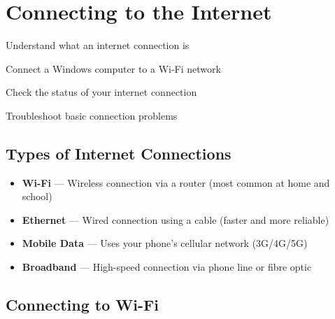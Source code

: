 
\chapter{Connecting to the Internet}
\label{ch:internet-win}

\begin{objectives}
  \item Understand what an internet connection is
  \item Connect a Windows computer to a Wi-Fi network
  \item Check the status of your internet connection
  \item Troubleshoot basic connection problems
\end{objectives}


\section{Types of Internet Connections}
\label{sec:connection-types}

\begin{theorybox}
\begin{itemize}[leftmargin=*, label={\textcolor{ModuleBlue}{\faAngleRight}}, itemsep=3pt]
  \item \textbf{Wi-Fi} --- Wireless connection via a router (most common at home and school)
  \item \textbf{Ethernet} --- Wired connection using a cable (faster and more reliable)
  \item \textbf{Mobile Data} --- Uses your phone's cellular network (3G/4G/5G)
  \item \textbf{Broadband} --- High-speed connection via phone line or fibre optic
\end{itemize}
\end{theorybox}

\section{Connecting to Wi-Fi}
\label{sec:connect-wifi}

